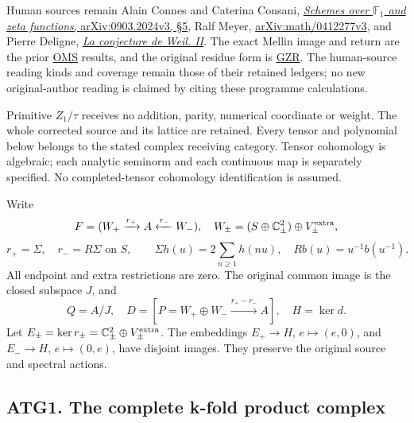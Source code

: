 Human sources remain Alain Connes and Caterina Consani,
\href{https://arxiv.org/abs/0903.2024v3}{\emph{Schemes over
\(\mathbb F_1\) and zeta functions}, arXiv:0903.2024v3, §5}, Ralf Meyer,
\href{https://arxiv.org/abs/math/0412277v3}{arXiv:math/0412277v3}, and
Pierre Deligne,
\href{https://www.numdam.org/item/PMIHES_1980__52__137_0/}{\emph{La
conjecture de Weil. II}}. The exact Mellin image and return are the
prior
\href{https://github.com/KokunoYumeto/zeta-function-research-reader/blob/36a82ecca98addb8a98b48204e349737856c7223/workbenches/splitzero-tandem/continuations/20260924-cohomology-weight-and-character-lifts/original-character-lifting/tau_lifting_weights_20260924/ORIGINAL_MELLIN_SPECTRAL_SYNTHESIS.md}{OMS}
results, and the original residue form is
\href{https://github.com/KokunoYumeto/zeta-function-research-reader/blob/36a82ecca98addb8a98b48204e349737856c7223/workbenches/splitzero-tandem/continuations/20260924-cohomology-weight-and-character-lifts/original-character-lifting/tau_lifting_weights_20260924/GLOBAL_ORIGINAL_ZETA_RESIDUE_DUALITY_INDEPENDENT.md}{GZR}.
The human-source reading kinds and coverage remain those of their
retained ledgers; no new original-author reading is claimed by citing
these programme calculations.

Primitive \(Z_1/\tau\) receives no addition, parity, numerical
coordinate or weight. The whole corrected source and its lattice are
retained. Every tensor and polynomial below belongs to the stated
complex receiving category. Tensor cohomology is algebraic; each
analytic seminorm and each continuous map is separately specified. No
completed-tensor cohomology identification is assumed.

Write \[
F=(W_+\xrightarrow{r_+}A\xleftarrow{r_-}W_-),\quad
W_\pm=(S\oplus\mathbb C^2_\pm)\oplus V_\pm^{\rm extra},
\] \[
r_+=\Sigma,\quad r_-=R\Sigma\text{ on }S,\qquad
\Sigma h(u)=2\sum_{n\ge1}h(nu),\quad Rb(u)=u^{-1}b(u^{-1}).
\] All endpoint and extra restrictions are zero. The original common
image is the closed subspace \(J\), and \[
Q=A/J,\quad
D=[P=W_+\oplus W_-\xrightarrow{r_+-r_-}A],\quad H=\ker d.
\] Let \(E_\pm=\ker r_\pm=\mathbb C^2_\pm\oplus V_\pm^{\rm extra}\). The
embeddings \(E_+\to H\), \(e\mapsto(e,0)\), and \(E_-\to H\),
\(e\mapsto(0,e)\), have disjoint images. They preserve the original
source and spectral actions.

\subsection{ATG1. The complete k-fold product
complex}\label{atg1.-the-complete-k-fold-product-complex}

